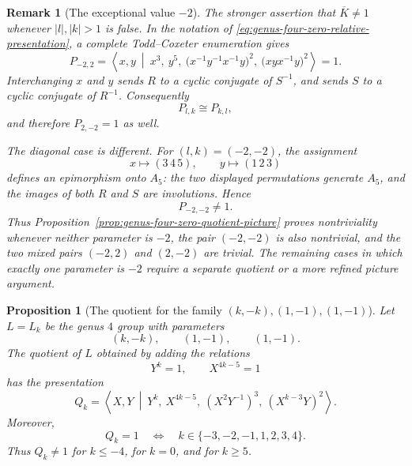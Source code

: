 \documentclass{article}
\newtheorem{prop}[theorem]{Proposition}
\newtheorem{remark}[theorem]{Remark}
\begin{document}
\begin{remark}[The exceptional value \(-2\)]
\label{rem:genus-four-zero-minus-two}
The stronger assertion that \(\overline K\neq1\) whenever
\(|l|,|k|>1\) is false.  In the notation of
\eqref{eq:genus-four-zero-relative-presentation}, a complete
Todd--Coxeter enumeration gives
\[
 P_{-2,2}
 =\left\langle x,y\ \middle|\
 x^3,\ y^5,\
 \bigl(x^{-1}y^{-1}x^{-1}y\bigr)^2,\
 \bigl(xyx^{-1}y\bigr)^2
 \right\rangle
 =1.
\]
Interchanging \(x\) and \(y\) sends \(R\) to a cyclic conjugate of
\(S^{-1}\), and sends \(S\) to a cyclic conjugate of \(R^{-1}\).
Consequently
\[
 P_{l,k}\cong P_{k,l},
\]
and therefore \(P_{2,-2}=1\) as well.

The diagonal case is different.  For \((l,k)=(-2,-2)\), the assignment
\[
 x\longmapsto(3\,4\,5),
 \qquad
 y\longmapsto(1\,2\,3)
\]
defines an epimorphism onto \(A_5\): the two displayed permutations
generate \(A_5\), and the images of both \(R\) and \(S\) are
involutions.  Hence
\[
 P_{-2,-2}\neq1.
\]
Thus Proposition~\ref{prop:genus-four-zero-quotient-picture} proves
nontriviality whenever neither parameter is \(-2\), the pair
\((-2,-2)\) is also nontrivial, and the two mixed pairs
\((-2,2)\) and \((2,-2)\) are trivial.  The remaining cases in which
exactly one parameter is \(-2\) require a separate quotient or a more
refined picture argument.
\end{remark}
\begin{prop}[The quotient for the family $(k,-k),(1,-1),(1,-1)$]
\label{prop:genus-four-k-minus-k-one-one-quotient}
Let $L=L_k$ be the genus $4$ group with parameters
\[
 (k,-k),\qquad (1,-1),\qquad (1,-1).
\]
The quotient of $L$ obtained by adding the relations
\[
 Y^k=1,
 \qquad
 X^{4k-5}=1
\]
has the presentation
\begin{equation}
\label{eq:genus-four-k-minus-k-corrected-quotient}
 Q_k=
 \left\langle X,Y\ \middle|\
 Y^k,\ X^{4k-5},\
 (X^2Y^{-1})^3,\
 (X^{k-3}Y)^2
 \right\rangle .
\end{equation}
  Moreover,
\[
 Q_k=1
 \quad\Longleftrightarrow\quad
 k\in\{-3,-2,-1,1,2,3,4\}.
\]
Thus $Q_k\neq1$ for $k\leq-4$, for $k=0$, and for $k\geq5$.
\end{prop}
\end{document}

